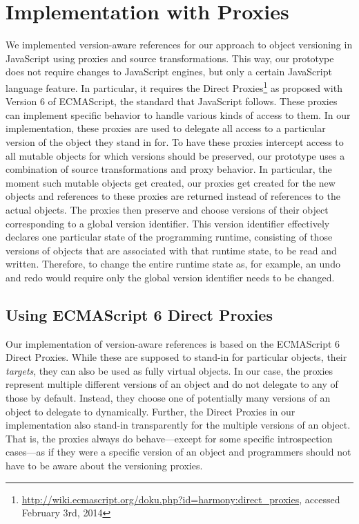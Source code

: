\chapter{Implementation with Proxies} \label{chapter:IMPLEMENTATION}


We implemented version-aware references for our approach to object versioning in JavaScript using proxies and source transformations.
This way, our prototype does not require changes to JavaScript engines, but only a certain JavaScript language feature.
In particular, it requires the Direct Proxies\footnote{\url{http://wiki.ecmascript.org/doku.php?id=harmony:direct_proxies}, accessed February 3rd, 2014} as proposed with Version 6 of ECMAScript, the standard that JavaScript follows.
These proxies can implement specific behavior to handle various kinds of access to them.
In our implementation, these proxies are used to delegate all access to a particular version of the object they stand in for.
To have these proxies intercept access to all mutable objects for which versions should be preserved, our prototype uses a combination of source transformations and proxy behavior.
In particular, the moment such mutable objects get created, our proxies get created for the new objects and references to these proxies are returned instead of references to the actual objects.
The proxies then preserve and choose versions of their object corresponding to a global version identifier.
This version identifier effectively declares one particular state of the programming runtime, consisting of those versions of objects that are associated with that runtime state, to be read and written.
Therefore, to change the entire runtime state as, for example, an undo and redo would require only the global version identifier needs to be changed.


\section{Using ECMAScript 6 Direct Proxies}

Our implementation of version-aware references is based on the ECMAScript 6 Direct Proxies.
While these are supposed to stand-in for particular objects, their \emph{targets}, they can also be used as fully virtual objects.
In our case, the proxies represent multiple different versions of an object and do not delegate to any of those by default.
Instead, they choose one of potentially many versions of an object to delegate to dynamically.
Further, the Direct Proxies in our implementation also stand-in transparently for the multiple versions of an object.
That is, the proxies always do behave---except for some specific introspection cases---as if they were a specific version of an object and programmers should not have to be aware about the versioning proxies.

